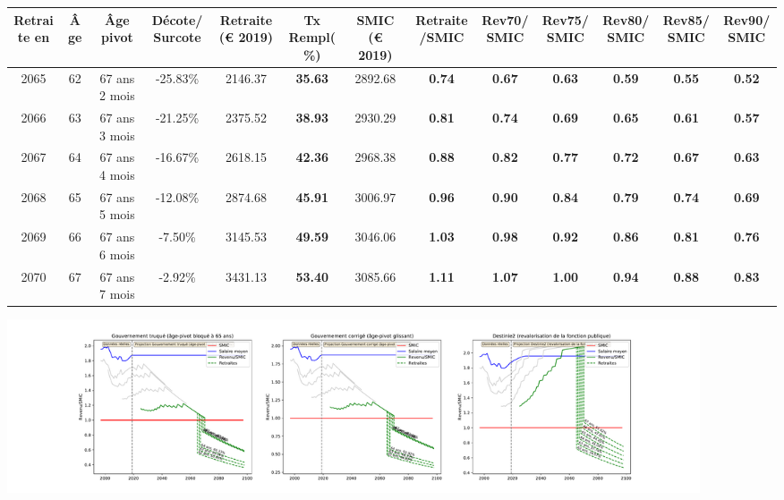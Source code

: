 { \scriptsize \begin{center} 
\begin{tabular}[htb]{|c|c||c|c||c|c||c||c|c|c|c|c|c|} 
\hline 
 Retraite en &  Âge &  Âge pivot &  Décote/Surcote &  Retraite (\euro{} 2019) &  Tx Rempl(\%) &  SMIC (\euro{} 2019) &  Retraite/SMIC &  Rev70/SMIC &  Rev75/SMIC &  Rev80/SMIC &  Rev85/SMIC &  Rev90/SMIC \\ 
\hline \hline 
 2065 &  62 &  67 ans 2 mois &  -25.83\% &  2146.37 &  {\bf 35.63} &  2892.68 &  {\bf {\color{red} 0.74}} &  {\bf {\color{red} 0.67}} &  {\bf {\color{red} 0.63}} &  {\bf {\color{red} 0.59}} &  {\bf {\color{red} 0.55}} &  {\bf {\color{red} 0.52}} \\ 
\hline 
 2066 &  63 &  67 ans 3 mois &  -21.25\% &  2375.52 &  {\bf 38.93} &  2930.29 &  {\bf {\color{red} 0.81}} &  {\bf {\color{red} 0.74}} &  {\bf {\color{red} 0.69}} &  {\bf {\color{red} 0.65}} &  {\bf {\color{red} 0.61}} &  {\bf {\color{red} 0.57}} \\ 
\hline 
 2067 &  64 &  67 ans 4 mois &  -16.67\% &  2618.15 &  {\bf 42.36} &  2968.38 &  {\bf {\color{red} 0.88}} &  {\bf {\color{red} 0.82}} &  {\bf {\color{red} 0.77}} &  {\bf {\color{red} 0.72}} &  {\bf {\color{red} 0.67}} &  {\bf {\color{red} 0.63}} \\ 
\hline 
 2068 &  65 &  67 ans 5 mois &  -12.08\% &  2874.68 &  {\bf 45.91} &  3006.97 &  {\bf {\color{red} 0.96}} &  {\bf {\color{red} 0.90}} &  {\bf {\color{red} 0.84}} &  {\bf {\color{red} 0.79}} &  {\bf {\color{red} 0.74}} &  {\bf {\color{red} 0.69}} \\ 
\hline 
 2069 &  66 &  67 ans 6 mois &  -7.50\% &  3145.53 &  {\bf 49.59} &  3046.06 &  {\bf 1.03} &  {\bf {\color{red} 0.98}} &  {\bf {\color{red} 0.92}} &  {\bf {\color{red} 0.86}} &  {\bf {\color{red} 0.81}} &  {\bf {\color{red} 0.76}} \\ 
\hline 
 2070 &  67 &  67 ans 7 mois &  -2.92\% &  3431.13 &  {\bf 53.40} &  3085.66 &  {\bf 1.11} &  {\bf 1.07} &  {\bf 1.00} &  {\bf {\color{red} 0.94}} &  {\bf {\color{red} 0.88}} &  {\bf {\color{red} 0.83}} \\ 
\hline 
\hline 
\end{tabular} 
\end{center} } 

 \begin{center}\includegraphics[width=0.9\textwidth]{fig/SecretaireAdmin_2003_22_dest_retraite.pdf}\end{center} \label{fig/SecretaireAdmin_2003_22_dest_retraite.pdf} 

